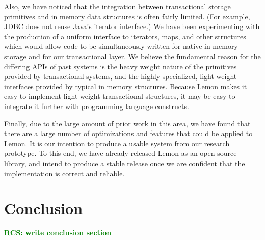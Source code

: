 \documentclass[10pt,letterpaper,twocolumn,english]{article}
\newcommand{\yad}{Lemon\xspace}
\newcommand{\rcs}[1]{\textcolor{green}{\bf RCS: #1}}
\begin{document}
Also, we have noticed that the integration between transactional
storage primitives and in memory data structures is often fairly
limited.  (For example, JDBC does not reuse Java's iterator
interface.)  We have been experimenting with the production of a
uniform interface to iterators, maps, and other structures which would
allow code to be simultaneously written for native in-memory storage
and for our transactional layer.  We believe the fundamental reason
for the differing APIs of past systems is the heavy weight nature of
the primitives provided by transactional systems, and the highly
specialized, light-weight interfaces provided by typical in memory
structures.  Because \yad makes it easy to implement light weight
transactional structures, it may be easy to integrate it further with
programming language constructs.

Finally, due to the large amount of prior work in this area, we have
found that there are a large number of optimizations and features that
could be applied to \yad.  It is our intention to produce a usable
system from our research prototype.  To this end, we have already
released \yad as an open source library, and intend to produce a
stable release once we are confident that the implementation is correct
and reliable.  


\section{Conclusion}

\rcs{write conclusion section}
\end{document}

